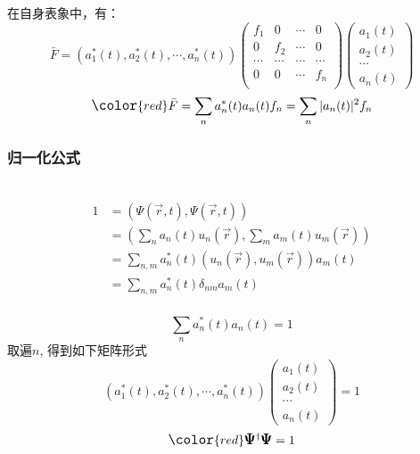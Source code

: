 \begin{frame} 
    在自身表象中，有：
    $$\bar{F} =(a_1 ^*(t), a_2 ^*(t),\cdots,a_n^*(t) )
    \begin{pmatrix}
       f_1 & 0 & \cdots & 0 \\
       0& f_2 & \cdots & 0 \\
       \cdots & \cdots &  \cdots& \cdots\\
        0 & 0 & \cdots & f_n \\
    \end{pmatrix}
    \begin{pmatrix}
        a_1(t)\\
        a_2(t)\\
        \cdots \\
        a_n(t)
    \end{pmatrix}
    $$
    \vspace{1.0em} 
    $$ \large \color{red} \bar{F} = \sum_n a_n^*(t) a_n(t) f_n= \sum_n |a_n(t)|^2 f_n $$
\end{frame}

\begin{frame} 
    \frametitle{归一化公式}
    \解~ 
    \begin{equation*}
        \begin{split}
            1 &=(\Psi(\vec{r},t), \Psi(\vec{r},t)) \\
            &= (\sum_n a_n(t) u_n(\vec{r}), \sum_m a_m(t) u_m(\vec{r}))\\
            &= \sum_{n,m} a_n ^*(t) (u_n(\vec{r}), u_m(\vec{r})) a_m(t)\\
            &= \sum_{n,m} a_n ^*(t) \delta_{nm} a_m(t)\\
        \end{split} 
    \end{equation*}
\end{frame}


\begin{frame} 
    $$  \sum_{n} a_n ^*(t) a_n(t) =1 $$
    取遍$n$, 得到如下矩阵形式\\
    $$ (a_1 ^*(t), a_2 ^*(t),\cdots,a_n^*(t) )
    \begin{pmatrix}
        a_1(t)\\
        a_2(t)\\
        \cdots \\
        a_n(t)
    \end{pmatrix}
    =1 $$ \vspace{1.0em} 
    $$ \large \color{red} \pmb {\Psi} ^{\dagger } \pmb {\Psi} =1 $$

\end{frame}

